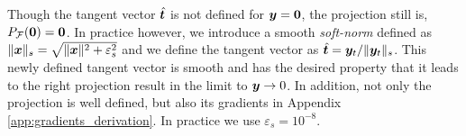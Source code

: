 Though the tangent vector $\hat{{\bm{t}}}$ is not defined for ${\bm{y}}={\bm{0}}$, the
projection still is, $P_\mathcal{F}({\bm{0}})={\bm{0}}$. In practice however, we
introduce a smooth \emph{soft-norm} defined as
$\|{\bm{x}}\|_s=\sqrt{\|{\bm{x}}\|^2+\varepsilon_s^2}$ and we define the tangent
vector as $\hat{{\bm{t}}}={\bm{y}}_t/\Vert{\bm{y}}_t\Vert_s$. This newly defined tangent vector is smooth and has the desired property that it leads to the right
projection result in the limit to ${\bm{y}}\rightarrow 0$. In addition, not only
the projection is well defined, but also its gradients in Appendix
\ref{app:gradients_derivation}. In practice we use $\varepsilon_s=10^{-8}$.

